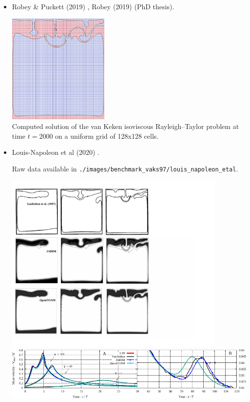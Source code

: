 \begin{itemize}
\item Robey \& Puckett (2019) \cite{ropu19}, Robey (2019) \cite{robe19} (PhD thesis).

\begin{center}
\includegraphics[width=5cm]{images/benchmark_vaks97/ropu19}\\
{\captionfont Computed solution of the van Keken isoviscous Rayleigh–Taylor problem
at time $t = 2000$ on a uniform grid of 128x128 cells. }
\end{center}



\item Louis-Napoleon et al (2020) \cite{logb20}.

Raw data available in {\tt ./images/benchmark\_vaks97/louis\_napoleon\_etal}.

\begin{center}
\includegraphics[width=11cm]{images/benchmark_vaks97/louis_napoleon_etal/VK1}\\
\includegraphics[width=14cm]{images/benchmark_vaks97/louis_napoleon_etal/VKzoom}
\end{center}


\end{itemize}
